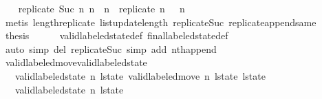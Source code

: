 \begin{isabellebody}
%
\isadelimproof
%
\endisadelimproof
%
\isatagproof
{}\isamarkupfalse%
{\isacharminus}\isanewline
\ \ \isamarkupfalse%
\ {\isachardoublequoteopen}{\isacharparenleft}replicate\ {\isacharparenleft}Suc\ n{\isacharparenright}\ {\isacharbraceleft}{\isacharbraceright}{\isacharparenright}{\isacharbrackleft}n\ {\isacharcolon}{\isacharequal}\ {\isacharbraceleft}{}{\isachardot}{\isachardot}{\isacharless}n{\isacharbraceright}{\isacharbrackright}\ {\isacharequal}\ {\isacharparenleft}replicate\ n\ {\isacharbraceleft}{\isacharbraceright}{\isacharparenright}\ {\isacharat}\ {\isacharbrackleft}{\isacharbraceleft}{}{\isachardot}{\isachardot}{\isacharless}n{\isacharbraceright}{\isacharbrackright}{\isachardoublequoteclose}\isanewline
\ \ \ \ \isamarkupfalse%
\ {\isacharparenleft}metis\ length{\isacharunderscore}replicate\ list{\isacharunderscore}update{\isacharunderscore}length\ replicate{\isacharunderscore}Suc\ replicate{\isacharunderscore}append{\isacharunderscore}same{\isacharparenright}\isanewline
\ \ \isamarkupfalse%
\ {\isacharquery}thesis\isanewline
\ \ \ \ \isamarkupfalse%
\ valid{\isacharunderscore}labeled{\isacharunderscore}state{\isacharunderscore}def\ final{\isacharunderscore}labeled{\isacharunderscore}state{\isacharunderscore}def\isanewline
\ \ \ \ \isamarkupfalse%
\ {\isacharparenleft}auto\ simp\ del{\isacharcolon}\ replicate{\isacharunderscore}Suc\ simp\ add{\isacharcolon}\ nth{\isacharunderscore}append{\isacharparenright}\isanewline
{}\isamarkupfalse%
%
\endisatagproof
{\isafoldproof}%
%
\isadelimproof
\isanewline
%
\endisadelimproof
\isanewline
{}\isamarkupfalse%
\ valid{\isacharunderscore}labeled{\isacharunderscore}move{\isacharunderscore}valid{\isacharunderscore}labeled{\isacharunderscore}state{\isacharcolon}\isanewline
\ \ \ {\isachardoublequoteopen}valid{\isacharunderscore}labeled{\isacharunderscore}state\ n\ l{\isacharunderscore}state{\isachardoublequoteclose}\ {\isachardoublequoteopen}valid{\isacharunderscore}labeled{\isacharunderscore}move\ n\ l{\isacharunderscore}state\ l{\isacharunderscore}state{\isacharprime}{\isachardoublequoteclose}\isanewline
\ \ \ {\isachardoublequoteopen}valid{\isacharunderscore}labeled{\isacharunderscore}state\ n\ l{\isacharunderscore}state{\isacharprime}{\isachardoublequoteclose}\isanewline
%
\isadelimproof
%
\endisadelimproof
%
\isatagproof
{}\isamarkupfalse%
{\isacharminus}\isanewline
\ \ \isamarkupfalse%

\end{isabellebody}
